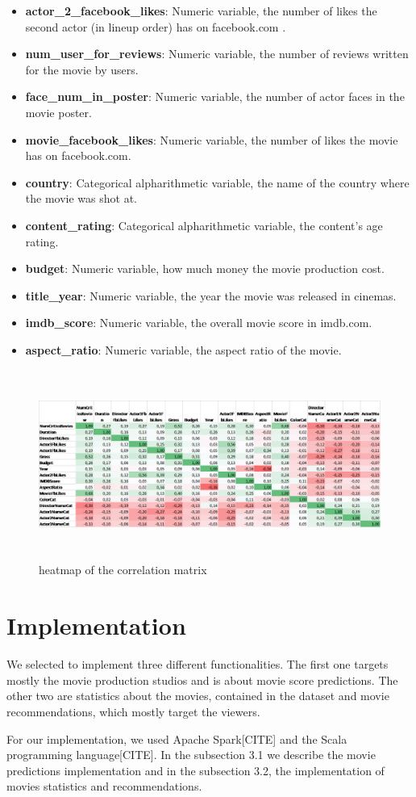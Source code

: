 \documentclass[letterpaper,twocolumn,10pt]{article}
\begin{document}
\begin{itemize}
\item \textbf{actor\_2\_facebook\_likes}: Numeric variable, the number of likes the second actor (in lineup order) has on facebook.com . 
\item \textbf{num\_user\_for\_reviews}: Numeric variable, the number of reviews written for the movie by users.
\item \textbf{face\_num\_in\_poster}: Numeric variable, the number of actor faces in the movie poster.
\item \textbf{movie\_facebook\_likes}: Numeric variable, the number of likes the movie has on facebook.com.
\item \textbf{country}: Categorical alpharithmetic variable, the name of the country where the movie was shot at.
\item \textbf{content\_rating}:  Categorical alpharithmetic variable, the content's age rating.
\item \textbf{budget}: Numeric variable, how much money the movie production cost.
\item \textbf{title\_year}: Numeric variable, the year the movie was released in cinemas.
\item \textbf{imdb\_score}: Numeric variable, the overall movie score in imdb.com.
\item \textbf{aspect\_ratio}: Numeric variable, the aspect ratio of the movie.
\end{itemize}

\begin{figure}	
	\includegraphics[width = \textwidth,height=6.2cm]{correlation_matrix_image}
	\caption{heatmap of the correlation matrix}
\end{figure}

\section{Implementation}
We selected to implement three different functionalities. The first one targets mostly the movie production studios and is about movie score predictions. The other two are statistics about the movies, contained in the dataset and movie recommendations, which mostly target the viewers. 
\par For our implementation, we used Apache Spark[CITE] and the Scala programming language[CITE]. In the subsection 3.1 we describe the movie predictions implementation and in the subsection 3.2, the implementation of movies statistics and recommendations.
\end{document}
